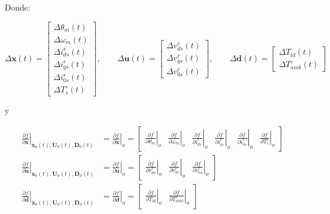 \documentclass[blue,fullpaper]{ludusofficial}  %
\begin{document}
Donde:

\begin{equation*}
\Delta \mathbf{x}(t)=\begin{bmatrix}
    \Delta \theta_{m}(t) \\[2mm]
    \Delta \omega_{m}(t) \\[2mm]
    \Delta i_{ds}^{r}(t) \\[2mm]
    \Delta i_{qs}^{r}(t)\\[2mm]
    \Delta i_{0s}^{r}(t) \\[2mm]
    \Delta T_{s}^{\circ}(t)
\end{bmatrix},\qquad 
\Delta \mathbf{u}(t)=\begin{bmatrix} \Delta v_{ds}^{r}(t) \\ \Delta v_{qs}^{r}(t) \\ \Delta v_{0s}^{r}(t) \end{bmatrix}, \qquad 
\Delta \mathbf{d}(t) = \begin{bmatrix} \Delta T_{ld}(t) \\ \Delta T_{amb}^{\circ}(t)  \end{bmatrix}
\end{equation*}

y

\begin{align*}
\left. \frac{\partial f}{\partial \mathbf{x}} \right|_{\mathbf{x}_0(t), \mathbf{U}_0(t), \mathbf{D}_0(t)}  & = \left. \frac{\partial f}{\partial \mathbf{x}} \right|_o = \begin{bmatrix} \left. \frac{\partial f}{\partial \theta_m} \right|_o & \left. \frac{\partial f}{\partial \omega_m} \right|_o & \left. \frac{\partial f}{\partial i_{ds}^r} \right|_o &  \left. \frac{\partial f}{\partial i_{qs}^r} \right|_o  & \left. \frac{\partial f}{\partial i_{0s}^r} \right|_o & \left. \frac{\partial f}{\partial T_s^{\circ}} \right|_o \end{bmatrix} \\
\left. \frac{\partial f}{\partial \mathbf{u}} \right|_{\mathbf{x}_0(t), \mathbf{U}_0(t), \mathbf{D}_0(t)}  & = \left. \frac{\partial f}{\partial \mathbf{u}} \right|_o = \begin{bmatrix} \left. \frac{\partial f}{\partial v_{ds}^{r}} \right|_o & \left. \frac{\partial f}{\partial v_{qs}^{r}} \right|_o & \left. \frac{\partial f}{\partial v_{0s}^{r}} \right|_o \end{bmatrix} \\
\left. \frac{\partial f}{\partial \mathbf{d}} \right|_{\mathbf{x}_0(t), \mathbf{U}_0(t), \mathbf{D}_0(t)}  & = \left. \frac{\partial f}{\partial \mathbf{d}} \right|_o = \begin{bmatrix} \left. \frac{\partial f}{\partial T_{ld}} \right|_o & \left. \frac{\partial f}{\partial T_{amb}^{\circ}} \right|_o \end{bmatrix}
\end{align*}
\end{document}
